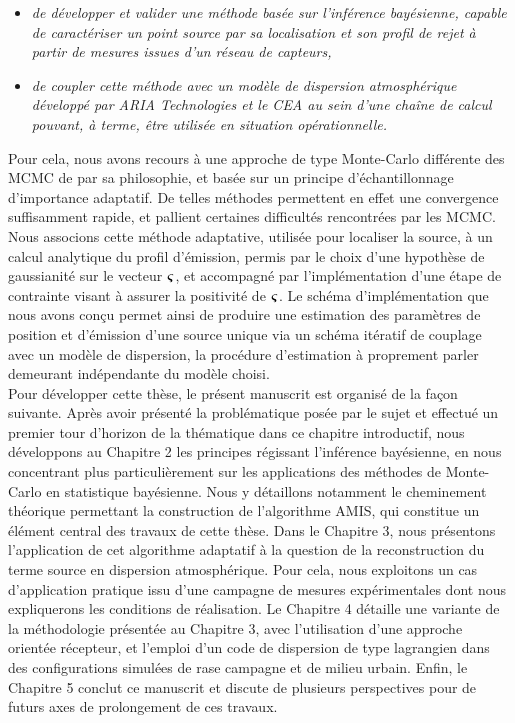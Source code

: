 \begin{itemize}
	\item \textit{de développer et valider une méthode basée sur l'inférence bayésienne, capable de caractériser un point source par sa localisation et son profil de rejet à partir de mesures issues d'un réseau de capteurs, }
	\item \textit{de coupler cette méthode avec un modèle de dispersion atmosphérique développé par ARIA Technologies et le CEA au sein d'une chaîne de calcul pouvant, à terme, être utilisée en situation opérationnelle.} \\
\end{itemize}


Pour cela, nous avons recours à une approche de type Monte-Carlo différente des MCMC de par sa philosophie, et basée sur un principe d'échantillonnage d'importance adaptatif. De telles méthodes permettent en effet une convergence suffisamment rapide, et pallient certaines difficultés rencontrées par les MCMC. Nous associons cette méthode adaptative, utilisée pour localiser la source, à un calcul analytique du profil d'émission, permis par le choix d'une hypothèse de gaussianité sur le vecteur ${\bm{\varsigma}}$, et accompagné par l'implémentation d'une étape de contrainte visant à assurer la positivité de ${\bm{\varsigma}}$. Le schéma d'implémentation que nous avons conçu permet ainsi de produire une estimation des paramètres de position et d'émission d'une source unique via un schéma itératif de couplage avec un modèle de dispersion, la procédure d'estimation à proprement parler demeurant indépendante du modèle choisi. \\

Pour développer cette thèse, le présent manuscrit est organisé de la façon suivante. Après avoir présenté la problématique posée par le sujet et effectué un premier tour d'horizon de la thématique dans ce chapitre introductif, nous développons au Chapitre 2 les principes régissant l'inférence bayésienne, en nous concentrant plus particulièrement sur les applications des méthodes de Monte-Carlo en statistique bayésienne. Nous y détaillons notamment le cheminement théorique permettant la construction de l'algorithme AMIS, qui constitue un élément central des travaux de cette thèse. 
Dans le Chapitre 3, nous présentons l'application de cet algorithme adaptatif à la question de la reconstruction du terme source en dispersion atmosphérique. Pour cela, nous exploitons un cas d'application pratique issu d'une campagne de mesures expérimentales dont nous expliquerons les conditions de réalisation. Le Chapitre 4 détaille une variante de la méthodologie présentée au Chapitre 3, avec l'utilisation d'une approche orientée récepteur, et l'emploi d'un code de dispersion de type lagrangien dans des configurations simulées de rase campagne et de milieu urbain.
Enfin, le Chapitre 5 conclut ce manuscrit et discute de plusieurs perspectives pour de futurs axes de prolongement de ces travaux.\\